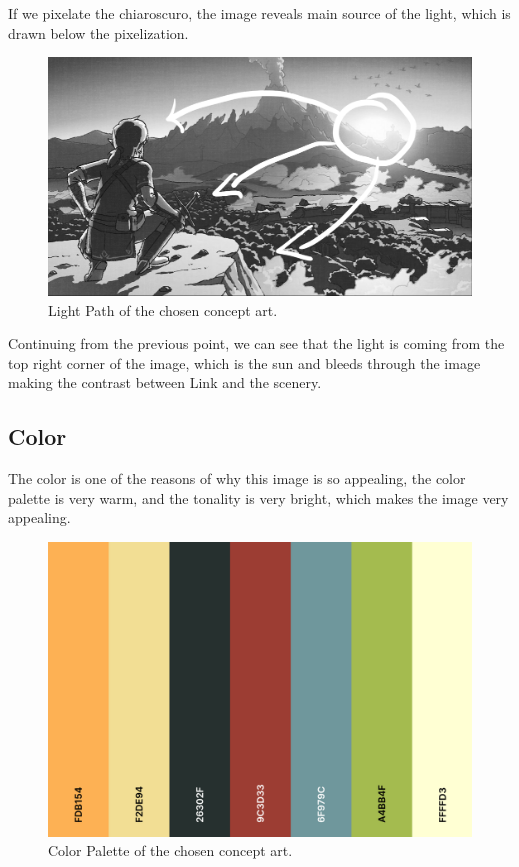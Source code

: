 \documentclass{cup-pan}
\begin{document}
            If we pixelate the chiaroscuro, the image reveals main source of the light, which is drawn below the pixelization. 
            \begin{figure}[H]
                \includegraphics[width=\textwidth]{Imagenes/Referencias/Analisis_ConceptArt/recorrido luz.png}
                \caption{Light Path of the chosen concept art.}
            \end{figure}

            Continuing from the previous point, we can see that the light is coming from the top right corner of the image, which is the sun and bleeds through the image making the contrast between Link and the scenery.\\
        \newpage
        \subsection{Color}

            The color is one of the reasons of why this image is so appealing, the color palette is very warm, and the tonality is very bright, which makes the image very appealing.\\
             \begin{figure}[H]
                \includegraphics[width=\textwidth]{Imagenes/Referencias/Analisis_ConceptArt/paleta.png}
                \caption{Color Palette of the chosen concept art.}
            \end{figure}
\end{document}
